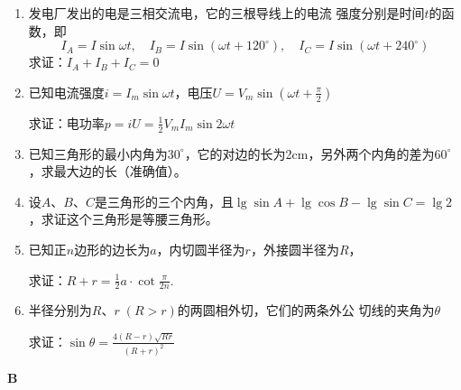 \begin{enumerate}
\item 发电厂发出的电是三相交流电，它的三根导线上的电流
强度分别是时间$t$的函数，即
\[I_A=I\sin\omega t,\quad I_B=I\sin(\omega t+120^{\circ}),\quad I_C=I\sin(\omega t+240^{\circ})\]
求证：$I_A+I_B+I_C=0$
\item 已知电流强度$i=I_m\sin\omega t$，电压$U=V_m\sin\left(\omega t+\frac{\pi}{2}\right)$

求证：电功率$p=iU=\frac{1}{2}V_mI_m\sin2\omega t$
\item 已知三角形的最小内角为$30^{\circ}$，它的对边的长为2cm，另外两个内角的差为$60^{\circ}$，求最大边的长（准确值）。
\item 设$A$、$B$、$C$是三角形的三个内角，且$\lg\sin A+\lg \cos B-\lg\sin C=\lg 2$，求证这个三角形是等腰三角形。
\item 已知正$n$边形的边长为$a$，内切圆半径为$r$，外接圆半径为$R$，

求证：$R+r=\frac{1}{2}a\cdot \cot\frac{\pi}{2n}$.

\item 半径分别为$R$、$r\; (R>r)$的两圆相外切，它们的两条外公
切线的夹角为$\theta$

求证：$\sin\theta=\frac{4\left(R-r\right)\sqrt{Rr}}{\left(R+r\right)^{2}}$
\end{enumerate}


\begin{center}
    \bfseries B
\end{center}

